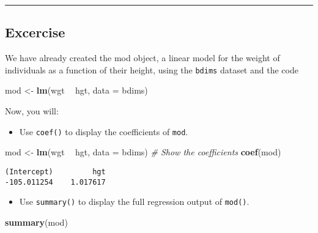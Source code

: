 \documentclass[
]{book}
\newenvironment{Shaded}{\begin{snugshade}}{\end{snugshade}}
\newcommand{\CommentTok}[1]{\textcolor[rgb]{0.56,0.35,0.01}{\textit{#1}}}
\newcommand{\DataTypeTok}[1]{\textcolor[rgb]{0.13,0.29,0.53}{#1}}
\newcommand{\KeywordTok}[1]{\textcolor[rgb]{0.13,0.29,0.53}{\textbf{#1}}}
\newcommand{\NormalTok}[1]{#1}
\newcommand{\OperatorTok}[1]{\textcolor[rgb]{0.81,0.36,0.00}{\textbf{#1}}}
\newcommand{\StringTok}[1]{\textcolor[rgb]{0.31,0.60,0.02}{#1}}
\providecommand{\tightlist}{%
  \setlength{\itemsep}{0pt}\setlength{\parskip}{0pt}}
\begin{document}
\begin{center}\rule{0.5\linewidth}{0.5pt}\end{center}

\hypertarget{excercise-1}{%
\subsection*{Excercise}\label{excercise-1}}

We have already created the mod object, a linear model for the weight of individuals as a function of their height, using the \texttt{bdims} dataset and the code

\begin{Shaded}
\begin{Highlighting}[]
\NormalTok{mod <-}\StringTok{ }\KeywordTok{lm}\NormalTok{(wgt }\OperatorTok{~}\StringTok{ }\NormalTok{hgt, }\DataTypeTok{data =}\NormalTok{ bdims)}
\end{Highlighting}
\end{Shaded}

Now, you will:

\begin{itemize}
\tightlist
\item
  Use \texttt{coef()} to display the coefficients of \texttt{mod}.
\end{itemize}

\begin{Shaded}
\begin{Highlighting}[]
\NormalTok{mod <-}\StringTok{ }\KeywordTok{lm}\NormalTok{(wgt }\OperatorTok{~}\StringTok{ }\NormalTok{hgt, }\DataTypeTok{data =}\NormalTok{ bdims)}
\CommentTok{# Show the coefficients}
\KeywordTok{coef}\NormalTok{(mod)}
\end{Highlighting}
\end{Shaded}

\begin{verbatim}
(Intercept)         hgt 
-105.011254    1.017617 
\end{verbatim}

\begin{itemize}
\tightlist
\item
  Use \texttt{summary()} to display the full regression output of \texttt{mod()}.
\end{itemize}

\begin{Shaded}
\begin{Highlighting}[]
\KeywordTok{summary}\NormalTok{(mod)}
\end{Highlighting}
\end{Shaded}
\end{document}
